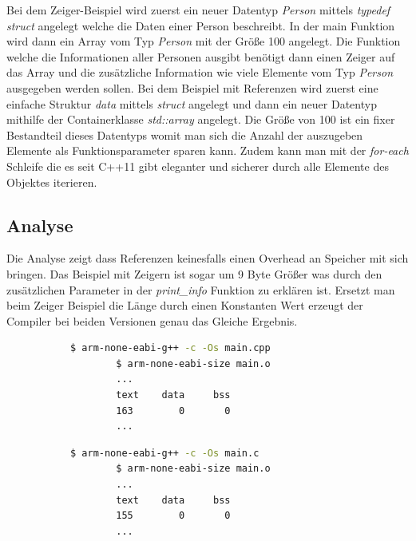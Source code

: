 \documentclass[MES,Master,ngerman]{twbook}%
\begin{document}
Bei dem Zeiger-Beispiel wird zuerst ein neuer Datentyp \textit{Person} mittels \textit{typedef struct} angelegt welche die Daten einer Person beschreibt. In der main Funktion wird dann ein Array vom Typ \textit{Person} mit der Größe 100 angelegt. Die Funktion welche die Informationen aller Personen ausgibt benötigt dann einen Zeiger auf das Array und die zusätzliche Information wie viele Elemente vom Typ \textit{Person} ausgegeben werden sollen.\newline \newline
Bei dem Beispiel mit Referenzen wird zuerst eine einfache Struktur \textit{data} mittels \textit{struct} angelegt und dann ein neuer Datentyp mithilfe der Containerklasse \textit{std::array} angelegt. Die Größe von 100 ist ein fixer Bestandteil dieses Datentyps womit man sich die Anzahl der auszugeben Elemente als Funktionsparameter sparen kann. Zudem kann man mit der \textit{for-each} Schleife die es seit C++11 gibt eleganter und sicherer durch alle Elemente des Objektes iterieren. 

\subsection{Analyse}
Die Analyse zeigt dass Referenzen keinesfalls einen Overhead an Speicher mit sich bringen. Das Beispiel mit Zeigern ist sogar um 9 Byte Größer was durch den zusätzlichen Parameter in der \textit{print\_info} Funktion zu erklären ist. Ersetzt man beim Zeiger Beispiel die Länge durch einen Konstanten Wert erzeugt der Compiler bei beiden Versionen genau das Gleiche Ergebnis.


\begin{figure}[!htb]
	\begin{subfigure}[b]{0.5\textwidth}
		\begin{lstlisting}[gobble=6, title={Analyse Zeiger Beispiel}, language=bash, numbers=none]
		$ arm-none-eabi-g++ -c -Os main.cpp
		$ arm-none-eabi-size main.o
		...
		text    data     bss
		163        0       0
		...
		\end{lstlisting}
	\end{subfigure}
	\begin{subfigure}[b]{0.5\textwidth}
		\begin{lstlisting}[gobble=6, title={Analyse Referenze Beispiel}, language=bash, numbers=none]
		$ arm-none-eabi-g++ -c -Os main.c
		$ arm-none-eabi-size main.o
		...
		text    data     bss
		155        0       0
		...
		\end{lstlisting}
	\end{subfigure}
\end{figure}
\end{document}
